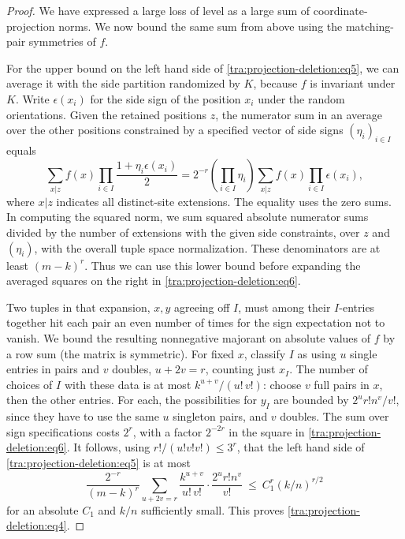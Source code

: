 \begin{proof}
We have expressed a large loss of level as a large sum of coordinate-projection norms. We now bound the same sum from above using the matching-pair symmetries of $f$.

For the upper bound on the left hand side of \eqref{tra:projection-deletion:eq5}, we can average it with the side partition randomized by \(K\), because \(f\) is invariant under \(K\). Write \(\epsilon(x_i)\) for the side sign of the position \(x_i\) under the random orientations. Given the retained positions \(z\), the numerator sum in an average over the other positions constrained by a specified vector of side signs \((\eta_i)_{i\in I}\) equals
\begin{equation}
\sum_{x|z} f(x)\prod_{i\in I}\frac{1+\eta_i\epsilon(x_i)}{2}
=2^{-r}\left(\prod_{i\in I}\eta_i\right)\sum_{x|z} f(x)\prod_{i\in I}\epsilon(x_i),
\label{tra:projection-deletion:eq6}
\end{equation}
where \(x|z\) indicates all distinct-site extensions. The equality uses the zero sums. In computing the squared norm, we sum squared absolute numerator sums divided by the number of extensions with the given side constraints, over \(z\) and \((\eta_i)\), with the overall tuple space normalization. These denominators are at least \((m-k)^r\). Thus we can use this lower bound before expanding the averaged squares on the right in \eqref{tra:projection-deletion:eq6}.

Two tuples in that expansion, \(x,y\) agreeing off \(I\), must among their \(I\)-entries together hit each pair an even number of times for the sign expectation not to vanish. We bound the resulting nonnegative majorant on absolute values of \(f\) by a row sum (the matrix is symmetric). For fixed \(x\), classify \(I\) as using \(u\) single entries in pairs and \(v\) doubles, \(u+2v=r\), counting just \(x_I\). The number of choices of \(I\) with these data is at most \(k^{u+v}/(u!\,v!)\): choose \(v\) full pairs in \(x\), then the other entries. For each, the possibilities for \(y_I\) are bounded by \(2^u r! n^v/v!\), since they have to use the same \(u\) singleton pairs, and \(v\) doubles. The sum over sign specifications costs \(2^r\), with a factor \(2^{-2r}\) in the square in \eqref{tra:projection-deletion:eq6}. It follows, using \(r!/(u!v!v!)\le 3^r\), that the left hand side of \eqref{tra:projection-deletion:eq5} is at most
\[
\frac{2^{-r}}{(m-k)^r}
\sum_{u+2v=r}\frac{k^{u+v}}{u!\,v!}\cdot\frac{2^u r! n^v}{v!}\ \le\ C_1^r(k/n)^{r/2}
\]
for an absolute \(C_1\) and \(k/n\) sufficiently small. This proves \eqref{tra:projection-deletion:eq4}.


\end{proof}
